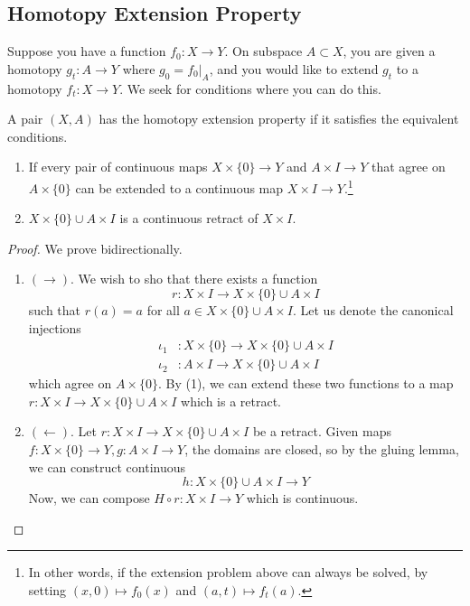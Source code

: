 \subsection{Homotopy Extension Property}

	Suppose you have a function $f_0 : X \to Y$. On subspace $A \subset X$, you are given a homotopy $g_t : A \to Y$ where $g_0 = f_0|_A$, and you would like to extend $g_t$ to a homotopy $f_t : X \to Y$. We seek for conditions where you can do this. 

	\begin{definition}
	  \label{def:homotopy-extension-property}
	  A pair $(X, A)$ has the homotopy extension property if it satisfies the equivalent conditions. 
		\begin{enumerate}
			\item If every pair of continuous maps $X \times \{0\} \to Y$ and $A \times I \to Y$ that agree on $A \times \{0\}$ can be extended to a continuous map $X \times I \to Y$.\footnote{In other words, if the extension problem above can always be solved, by setting $(x, 0) \mapsto f_0 (x)$ and $(a, t) \mapsto f_t(a)$.} 
			\item $X \times \{0\} \cup A \times I$ is a continuous retract of $X \times I$. 
		\end{enumerate}
	\end{definition}
	\begin{proof}
	  We prove bidirectionally. 
		\begin{enumerate}
		  \item $(\rightarrow)$. We wish to sho that there exists a function 
				\begin{equation}
					r: X \times I \to X \times \{0\} \cup A \times I
				\end{equation}
				such that $r(a) = a$ for all $a \in X \times \{0\} \cup A \times I$. Let us denote the canonical injections
				\begin{align}
					\iota_1 & : X \times \{0\} \to X \times \{0\} \cup A \times I \\ 
					\iota_2 & : A \times I \to X \times \{0\} \cup A \times I 
				\end{align}
				which agree on $A \times \{0\}$. By (1), we can extend these two functions to a map $r: X \times I \to X \times \{0\} \cup A \times I$ which is a retract. 

			\item $(\leftarrow)$. Let $r: X \times I \to X \times \{0\} \cup A \times I$ be a retract. Given maps $f: X \times \{0\} \to Y, g: A \times I \to Y$, the domains are closed, so by the gluing lemma, we can construct continuous 
				\begin{equation}
					h: X \times \{0\} \cup A \times I \to Y
				\end{equation}
				Now, we can compose $H \circ r: X \times I \to Y$ which is continuous. 
		\end{enumerate}
	\end{proof}

